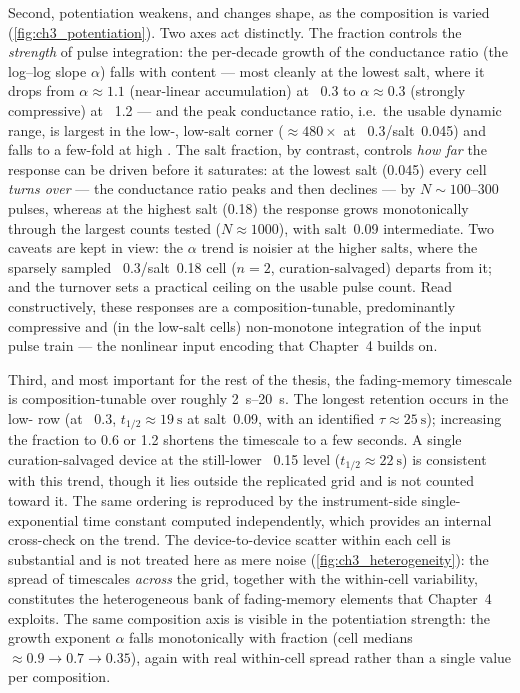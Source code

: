\documentclass[12pt, twoside]{report}
\begin{document}
Second, potentiation weakens, and changes shape, as the composition is varied (\cref{fig:ch3_potentiation}). Two axes act distinctly. The \PEO{} fraction controls the \emph{strength} of pulse integration: the per-decade growth of the conductance ratio (the log--log slope $\alpha$) falls with \PEO{} content --- most cleanly at the lowest salt, where it drops from $\alpha\approx 1.1$ (near-linear accumulation) at \PEO{}~\num{0.3} to $\alpha\approx 0.3$ (strongly compressive) at \PEO{}~\num{1.2} --- and the peak conductance ratio, i.e.\ the usable dynamic range, is largest in the low-\PEO{}, low-salt corner ($\approx 480\times$ at \PEO{}~\num{0.3}/salt~\num{0.045}) and falls to a few-fold at high \PEO{}. The salt fraction, by contrast, controls \emph{how far} the response can be driven before it saturates: at the lowest salt (\num{0.045}) every cell \emph{turns over} --- the conductance ratio peaks and then declines --- by $N\sim\numrange{100}{300}$ pulses, whereas at the highest salt (\num{0.18}) the response grows monotonically through the largest counts tested ($N\approx 1000$), with salt~\num{0.09} intermediate. Two caveats are kept in view: the $\alpha$ trend is noisier at the higher salts, where the sparsely sampled \PEO{}~\num{0.3}/salt~\num{0.18} cell ($n=2$, curation-salvaged) departs from it; and the turnover sets a practical ceiling on the usable pulse count. Read constructively, these responses are a composition-tunable, predominantly compressive and (in the low-salt cells) non-monotone integration of the input pulse train --- the nonlinear input encoding that Chapter~4 builds on.

Third, and most important for the rest of the thesis, the fading-memory timescale is composition-tunable over roughly \SIrange{2}{20}{\second}. The longest retention occurs in the low-\PEO{} row (at \PEO{}~\num{0.3}, \(t_{1/2}\approx\SI{19}{\second}\) at salt~\num{0.09}, with an identified \(\tau\approx\SI{25}{\second}\)); increasing the \PEO{} fraction to \num{0.6} or \num{1.2} shortens the timescale to a few seconds. A single curation-salvaged device at the still-lower \PEO{}~\num{0.15} level (\(t_{1/2}\approx\SI{22}{\second}\)) is consistent with this trend, though it lies outside the replicated grid and is not counted toward it. The same ordering is reproduced by the instrument-side single-exponential time constant computed independently, which provides an internal cross-check on the trend. The device-to-device scatter within each cell is substantial and is not treated here as mere noise (\cref{fig:ch3_heterogeneity}): the spread of timescales \emph{across} the grid, together with the within-cell variability, constitutes the heterogeneous bank of fading-memory elements that Chapter~4 exploits. The same composition axis is visible in the potentiation strength: the growth exponent \(\alpha\) falls monotonically with \PEO{} fraction (cell medians \(\approx0.9\to0.7\to0.35\)), again with real within-cell spread rather than a single value per composition.
\end{document}
